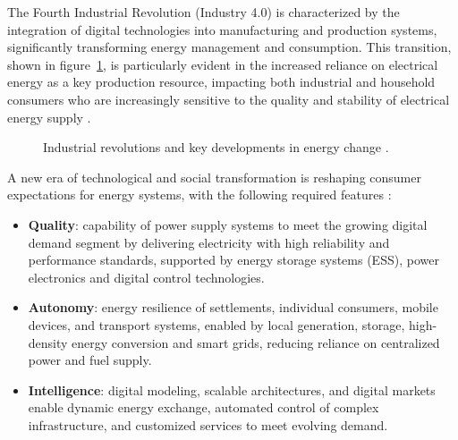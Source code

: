 
{\actuality} 
The Fourth Industrial Revolution (Industry 4.0) is characterized by the integration of digital technologies into manufacturing and production systems, significantly transforming energy management and consumption. This transition, shown in figure~\cref{fig:industry4}, is particularly evident in the increased reliance on electrical energy as a key production resource, impacting both industrial and household consumers who are increasingly sensitive to the quality and stability of electrical energy supply \autocite{He_2022}.

\begin{figure}[ht]
    \caption{Industrial revolutions and key developments in energy change \cite{UNIDO2017}.}\label{fig:industry4}
\end{figure}

A new era of technological and social transformation is reshaping consumer expectations for energy systems, with the following required features \autocite{kholkin2025energy}:
\begin{itemize}
    \item  \textbf{Quality}: capability of power supply systems to meet the growing digital demand segment by delivering electricity with high reliability and performance standards, supported by energy storage systems (ESS), power electronics and digital control technologies.
    
    \item  \textbf{Autonomy}: energy resilience of settlements, individual consumers, mobile devices, and transport systems, enabled by local generation, storage, high-density energy conversion and smart grids, reducing reliance on centralized power and fuel supply.
    
    \item  \textbf{Intelligence}: digital modeling, scalable architectures, and digital markets enable dynamic energy exchange, automated control of complex infrastructure, and customized services to meet evolving demand.
\end{itemize}




